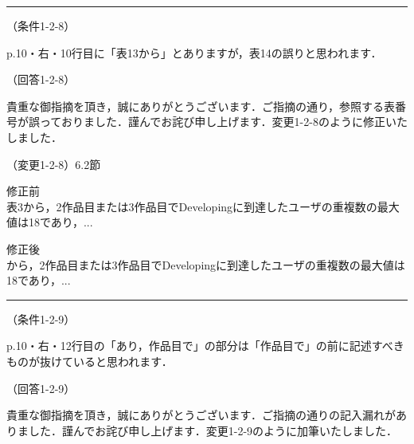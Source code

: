 \documentclass{jarticle} %
\def\subsection#1{ \vspace{1pc} {\gt #1} }
\def\nextans{ \vspace{2pc} \hrule }
\begin{document}
\newpage
\nextans
\subsection{（条件1-2-8）}

p.10・右・10行目に「表13から」とありますが，表14の誤りと思われます．

\subsection{（回答1-2-8）}

貴重な御指摘を頂き，誠にありがとうございます．ご指摘の通り，参照する表番号が誤っておりました．謹んでお詫び申し上げます．変更1-2-8のように修正いたしました．

\subsection{（変更1-2-8）6.2節}
\vspace{-0.3cm}
\begin{description}
\item 修正前\\
\phantom{　}
表3から，2作品目または3作品目でDevelopingに到達したユーザの重複数の最大値は18であり，...
\vspace{-0.3cm}
\item 修正後\\
\phantom{　}
\textcolor{red}{}から，2作品目または3作品目でDevelopingに到達したユーザの重複数の最大値は18であり，...
\end{description}



\newpage
\nextans
\subsection{（条件1-2-9）}

p.10・右・12行目の「あり，作品目で」の部分は「作品目で」の前に記述すべきものが抜けていると思われます．

\subsection{（回答1-2-9）}

貴重な御指摘を頂き，誠にありがとうございます．ご指摘の通りの記入漏れがありました．謹んでお詫び申し上げます．変更1-2-9のように加筆いたしました．
\end{document}
